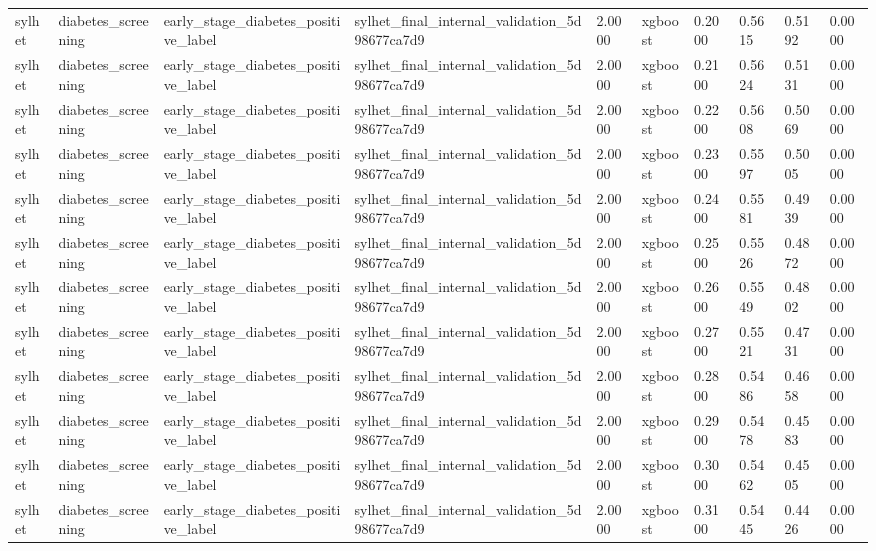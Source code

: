 \begin{tabular}{llllllllll}
sylhet & diabetes\_screening & early\_stage\_diabetes\_positive\_label & sylhet\_final\_internal\_validation\_5d98677ca7d9 & 2.0000 & xgboost & 0.2000 & 0.5615 & 0.5192 & 0.0000 \\
sylhet & diabetes\_screening & early\_stage\_diabetes\_positive\_label & sylhet\_final\_internal\_validation\_5d98677ca7d9 & 2.0000 & xgboost & 0.2100 & 0.5624 & 0.5131 & 0.0000 \\
sylhet & diabetes\_screening & early\_stage\_diabetes\_positive\_label & sylhet\_final\_internal\_validation\_5d98677ca7d9 & 2.0000 & xgboost & 0.2200 & 0.5608 & 0.5069 & 0.0000 \\
sylhet & diabetes\_screening & early\_stage\_diabetes\_positive\_label & sylhet\_final\_internal\_validation\_5d98677ca7d9 & 2.0000 & xgboost & 0.2300 & 0.5597 & 0.5005 & 0.0000 \\
sylhet & diabetes\_screening & early\_stage\_diabetes\_positive\_label & sylhet\_final\_internal\_validation\_5d98677ca7d9 & 2.0000 & xgboost & 0.2400 & 0.5581 & 0.4939 & 0.0000 \\
sylhet & diabetes\_screening & early\_stage\_diabetes\_positive\_label & sylhet\_final\_internal\_validation\_5d98677ca7d9 & 2.0000 & xgboost & 0.2500 & 0.5526 & 0.4872 & 0.0000 \\
sylhet & diabetes\_screening & early\_stage\_diabetes\_positive\_label & sylhet\_final\_internal\_validation\_5d98677ca7d9 & 2.0000 & xgboost & 0.2600 & 0.5549 & 0.4802 & 0.0000 \\
sylhet & diabetes\_screening & early\_stage\_diabetes\_positive\_label & sylhet\_final\_internal\_validation\_5d98677ca7d9 & 2.0000 & xgboost & 0.2700 & 0.5521 & 0.4731 & 0.0000 \\
sylhet & diabetes\_screening & early\_stage\_diabetes\_positive\_label & sylhet\_final\_internal\_validation\_5d98677ca7d9 & 2.0000 & xgboost & 0.2800 & 0.5486 & 0.4658 & 0.0000 \\
sylhet & diabetes\_screening & early\_stage\_diabetes\_positive\_label & sylhet\_final\_internal\_validation\_5d98677ca7d9 & 2.0000 & xgboost & 0.2900 & 0.5478 & 0.4583 & 0.0000 \\
sylhet & diabetes\_screening & early\_stage\_diabetes\_positive\_label & sylhet\_final\_internal\_validation\_5d98677ca7d9 & 2.0000 & xgboost & 0.3000 & 0.5462 & 0.4505 & 0.0000 \\
sylhet & diabetes\_screening & early\_stage\_diabetes\_positive\_label & sylhet\_final\_internal\_validation\_5d98677ca7d9 & 2.0000 & xgboost & 0.3100 & 0.5445 & 0.4426 & 0.0000 \\

\end{tabular}

